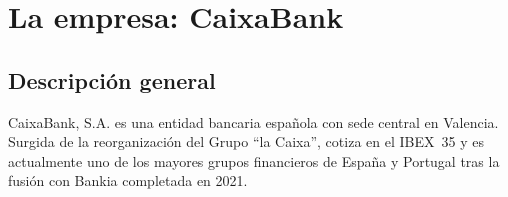 %
%

\chapter{La empresa: CaixaBank}

\section{Descripción general}


CaixaBank, S.A. es una entidad bancaria española con sede central en Valencia.
Surgida de la reorganización del Grupo ``la Caixa'', cotiza en el IBEX~35
y es actualmente uno de los mayores grupos financieros de España y Portugal
tras la fusión con Bankia completada en 2021.

